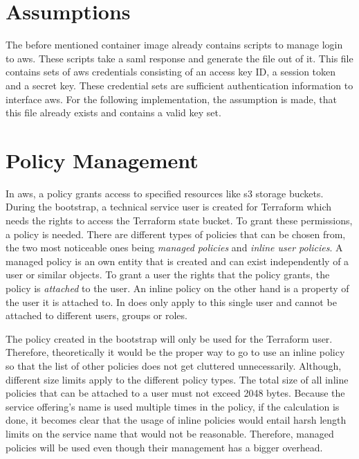 \section{Assumptions}
The before mentioned container image already contains scripts to manage login to \ac{aws}.
These scripts take a \ac{saml} response and generate the file  out of it.
This file contains sets of \ac{aws} credentials consisting of an access key ID, a session token and a secret key.
These credential sets are sufficient authentication information to interface \ac{aws}.
For the following implementation, the assumption is made, that this file already exists and contains a valid key set.

\section{Policy Management}
In \ac{aws}, a policy grants access to specified resources like \ac{s3} storage buckets.
During the bootstrap, a technical service user is created for Terraform which needs the rights to access the Terraform state bucket.
To grant these permissions, a policy is needed.
There are different types of policies that can be chosen from, the two most noticeable ones being \emph{managed policies} and \emph{inline user policies}.
A managed policy is an own entity that is created and can exist independently of a user or similar objects.
To grant a user the rights that the policy grants, the policy is \emph{attached} to the user.
An inline policy on the other hand is a property of the user it is attached to.
In does only apply to this single user and cannot be attached to different users, groups or roles.

The policy created in the bootstrap will only be used for the Terraform user.
Therefore, theoretically it would be the proper way to go to use an inline policy so that the list of other policies does not get cluttered unnecessarily.
Although, different size limits apply to the different policy types.
The total size of all inline policies that can be attached to a user must not exceed 2048 bytes.
Because the service offering's name is used multiple times in the policy, if the calculation is done, it becomes clear that the usage of inline policies would entail harsh length limits on the service name that would not be reasonable.
Therefore, managed policies will be used even though their management has a bigger overhead.